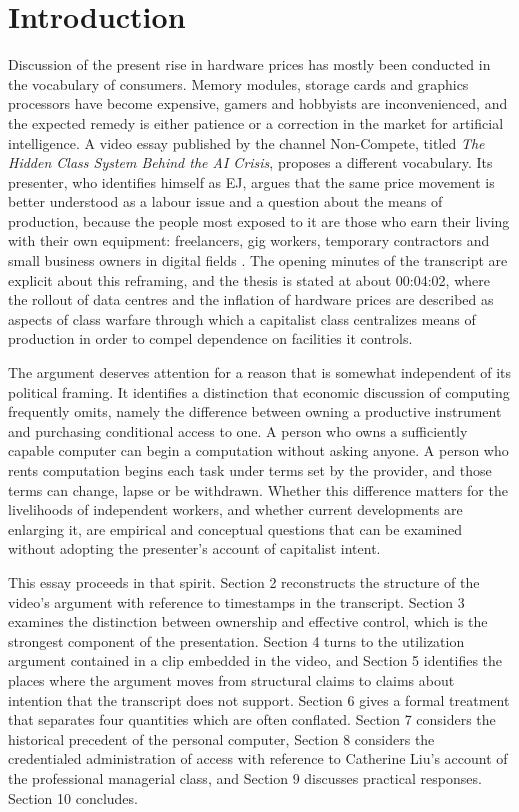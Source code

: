 \documentclass[11pt]{article}
\theoremstyle{plain}
\theoremstyle{definition}
\begin{document}
\newpage

\section{Introduction}

Discussion of the present rise in hardware prices has mostly been conducted in the vocabulary of consumers. Memory modules, storage cards and graphics processors have become expensive, gamers and hobbyists are inconvenienced, and the expected remedy is either patience or a correction in the market for artificial intelligence. A video essay published by the channel Non-Compete, titled \emph{The Hidden Class System Behind the AI Crisis}, proposes a different vocabulary. Its presenter, who identifies himself as EJ, argues that the same price movement is better understood as a labour issue and a question about the means of production, because the people most exposed to it are those who earn their living with their own equipment: freelancers, gig workers, temporary contractors and small business owners in digital fields \cite{nc}. The opening minutes of the transcript are explicit about this reframing, and the thesis is stated at about 00:04:02, where the rollout of data centres and the inflation of hardware prices are described as aspects of class warfare through which a capitalist class centralizes means of production in order to compel dependence on facilities it controls.

The argument deserves attention for a reason that is somewhat independent of its political framing. It identifies a distinction that economic discussion of computing frequently omits, namely the difference between owning a productive instrument and purchasing conditional access to one. A person who owns a sufficiently capable computer can begin a computation without asking anyone. A person who rents computation begins each task under terms set by the provider, and those terms can change, lapse or be withdrawn. Whether this difference matters for the livelihoods of independent workers, and whether current developments are enlarging it, are empirical and conceptual questions that can be examined without adopting the presenter's account of capitalist intent.

This essay proceeds in that spirit. Section 2 reconstructs the structure of the video's argument with reference to timestamps in the transcript. Section 3 examines the distinction between ownership and effective control, which is the strongest component of the presentation. Section 4 turns to the utilization argument contained in a clip embedded in the video, and Section 5 identifies the places where the argument moves from structural claims to claims about intention that the transcript does not support. Section 6 gives a formal treatment that separates four quantities which are often conflated. Section 7 considers the historical precedent of the personal computer, Section 8 considers the credentialed administration of access with reference to Catherine Liu's account of the professional managerial class, and Section 9 discusses practical responses. Section 10 concludes.
\end{document}
